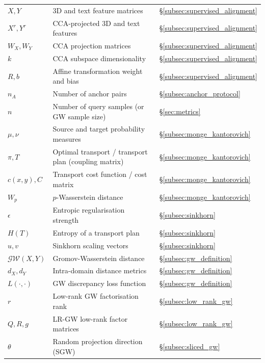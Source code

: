 \begin{longtable}{lll}
$X, Y$                  & 3D and text feature matrices & \S\ref{subsec:supervised_alignment} \\
$X^r, Y^r$               & CCA-projected 3D and text features & \S\ref{subsec:supervised_alignment} \\
$W_X, W_Y$               & CCA projection matrices & \S\ref{subsec:supervised_alignment} \\
$k$                      & CCA subspace dimensionality & \S\ref{subsec:supervised_alignment} \\
$R, b$                   & Affine transformation weight and bias & \S\ref{subsec:supervised_alignment} \\
$n_A$                    & Number of anchor pairs & \S\ref{subsec:anchor_protocol} \\
$n$                      & Number of query samples (or GW sample size) & \S\ref{sec:metrics} \\
$\mu, \nu$                & Source and target probability measures & \S\ref{subsec:monge_kantorovich} \\
$\pi, T$                 & Optimal transport / transport plan (coupling matrix) & \S\ref{subsec:monge_kantorovich} \\
$c(x,y), C$               & Transport cost function / cost matrix & \S\ref{subsec:monge_kantorovich} \\
$W_p$                    & $p$-Wasserstein distance & \S\ref{subsec:monge_kantorovich} \\
$\epsilon$                & Entropic regularisation strength & \S\ref{subsec:sinkhorn} \\
$H(T)$                   & Entropy of a transport plan & \S\ref{subsec:sinkhorn} \\
$u, v$                   & Sinkhorn scaling vectors & \S\ref{subsec:sinkhorn} \\
$\mathcal{GW}(X,Y)$        & Gromov-Wasserstein distance & \S\ref{subsec:gw_definition} \\
$d_X, d_Y$                & Intra-domain distance metrics & \S\ref{subsec:gw_definition} \\
$L(\cdot,\cdot)$          & GW discrepancy loss function & \S\ref{subsec:gw_definition} \\
$r$                      & Low-rank GW factorisation rank & \S\ref{subsec:low_rank_gw} \\
$Q, R, g$                 & LR-GW low-rank factor matrices & \S\ref{subsec:low_rank_gw} \\
$\theta$                 & Random projection direction (SGW) & \S\ref{subsec:sliced_gw} \\

\end{longtable}
